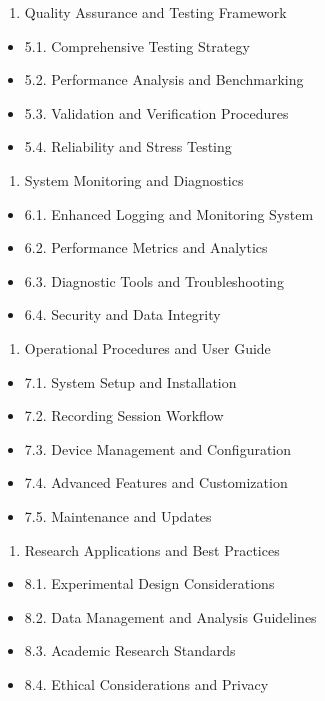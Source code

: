 \documentclass[11pt,a4paper]{article}
\begin{document}
\begin{enumerate}
\item Quality Assurance and Testing Framework
\end{enumerate}
\begin{itemize}
\item 5.1. Comprehensive Testing Strategy
\item 5.2. Performance Analysis and Benchmarking
\item 5.3. Validation and Verification Procedures
\item 5.4. Reliability and Stress Testing

\end{itemize}
\begin{enumerate}
\item System Monitoring and Diagnostics
\end{enumerate}
\begin{itemize}
\item 6.1. Enhanced Logging and Monitoring System
\item 6.2. Performance Metrics and Analytics
\item 6.3. Diagnostic Tools and Troubleshooting
\item 6.4. Security and Data Integrity

\end{itemize}
\begin{enumerate}
\item Operational Procedures and User Guide
\end{enumerate}
\begin{itemize}
\item 7.1. System Setup and Installation
\item 7.2. Recording Session Workflow
\item 7.3. Device Management and Configuration
\item 7.4. Advanced Features and Customization
\item 7.5. Maintenance and Updates

\end{itemize}
\begin{enumerate}
\item Research Applications and Best Practices
\end{enumerate}
\begin{itemize}
\item 8.1. Experimental Design Considerations
\item 8.2. Data Management and Analysis Guidelines
\item 8.3. Academic Research Standards
\item 8.4. Ethical Considerations and Privacy

\end{itemize}
\end{document}

